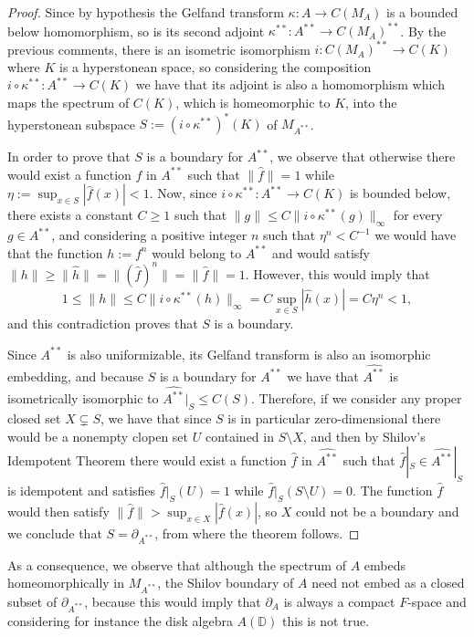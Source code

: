 \documentclass[preprint,12pt,number]{elsarticle}
\newcommand{\D}{\mathbb{D}}
\begin{document}
\begin{proof}
    Since by hypothesis the Gelfand transform $\kappa \colon A \to C(M_A)$ is a bounded below homomorphism, so is its second adjoint $\kappa^{**} \colon A^{**} \to C(M_A)^{**}$. By the previous comments, there is an isometric isomorphism $i \colon C(M_A)^{**} \to C(K)$ where $K$ is a hyperstonean space, so considering the composition $i\circ \kappa^{**} \colon A^{**} \to C(K)$ we have that its adjoint is also a homomorphism which maps the spectrum of $C(K)$, which is homeomorphic to $K$, into the hyperstonean subspace $S:=(i\circ \kappa^{**})^*(K)$ of $M_{A^{**}}$. 
    
    In order to prove that $S$ is a boundary for $A^{**}$, we observe that otherwise there would exist a function $f$ in $A^{**}$ such that $\lVert\hat{f}\rVert=1$ while $\eta:=\sup_{x\in S}|\hat{f}(x)|<1$. Now, since $i\circ \kappa^{**} \colon A^{**} \to C(K)$ is bounded below, there exists a constant $C\geq 1$ such that $\lVert g\rVert\leq C\lVert i\circ \kappa^{**}(g)\rVert_\infty$ for every $g\in A^{**}$, and considering a positive integer $n$ such that $\eta^n<C^{-1}$ we would have that the function $h:=f^n$ would belong to $A^{**}$ and would satisfy $\lVert h\rVert\geq\lVert\hat{h}\rVert=\lVert(\hat{f})^n\rVert=\lVert\hat{f}\rVert=1$. However, this would imply that 
    \[
    1\leq \lVert h\rVert\leq C\lVert i\circ \kappa^{**}(h)\rVert_\infty=C \sup_{x\in S}|\hat{h}(x)|=C\eta^n <1,
    \] 
    and this contradiction proves that $S$ is a boundary. 

    Since $A^{**}$ is also uniformizable, its Gelfand transform is also an isomorphic embedding, and because $S$ is a boundary for $A^{**}$ we have that $\widehat{A^{**}}$ is isometrically isomorphic to $\widehat{A^{**}}|_S\leq C(S)$. Therefore, if we consider any proper closed set $X\subsetneq S$, we have that since $S$ is in particular zero-dimensional there would be a nonempty clopen set $U$ contained in $S\setminus X$, and then by Shilov's Idempotent Theorem \cite[p. 88]{Gamelin1969} there would exist a function $\hat{f}$ in $\widehat{A^{**}}$ such that $\hat{f}|_S\in \widehat{A^{**}}|_S$ is idempotent and satisfies $\hat{f}|_S(U)=1$ while $\hat{f}|_S(S\setminus U)=0$. The function $\hat{f}$ would then satisfy $\lVert\hat{f}\rVert>\sup_{x\in X}|\hat{f}(x)|$, so $X$ could not be a boundary and we conclude that $S=\partial_{A^{**}}$, from where the theorem follows.
\end{proof}

As a consequence, we observe that although the spectrum of $A$ embeds homeomorphically in $M_{A^{**}}$, the Shilov boundary of $A$ need not embed as a closed subset of $\partial_{A^{**}}$, because this would imply that $\partial_A$ is always a compact $F$-space and considering for instance the disk algebra $A(\D)$ this is not true. 
\end{document}
